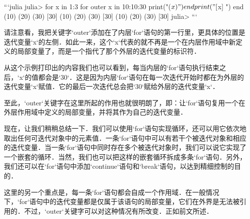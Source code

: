 ```julia
julia> for x in 1:3
           for outer x in 10:10:30
               print("($x) ")
           end
           print("[$x] ")
       end
(10) (20) (30) [30] (10) (20) (30) [30] (10) (20) (30) [30] 
julia> 
```

请注意看，我把关键字`outer`添加在了内层`for`语句的第一行里，更具体的位置是迭代变量`x`的左侧．如此一来，这个`x`代表的就不再是一个在内层作用域中新定义的局部变量了，而是一个指代了那个外层的迭代变量的标识符．

从这个示例打印出的内容我们也可以看到，每当内层的`for`语句执行结束之后，`x`的值都会是`30`．这是因为内层`for`语句在每一次迭代开始时都在为外层的迭代变量`x`赋值．它的最后一次迭代总会把`30`赋给外层的迭代变量`x`．

至此，`outer`关键字在这里所起的作用也就很明朗了，即：让`for`语句复用一个在外层作用域中定义的局部变量，并将其作为自己的迭代变量．

现在，让我们稍稍总结一下．我们可以使用`for`语句实现循环，还可以用它依次地取出任何可迭代对象中的元素值．一条`for`语句中可以有若干个被迭代对象和相应的迭代变量．当一条`for`语句中同时存在多个被迭代对象时，我们可以说它实现了一个嵌套的循环．当然，我们也可以把这样的嵌套循环拆成多条`for`语句．另外，我们还可以在`for`语句中添加`continue`语句和`break`语句，以达到精细控制的目的．

这里的另一个重点是，每一条`for`语句都会自成一个作用域．在一般情况下，`for`语句中的迭代变量都是仅属于该语句的局部变量，它们在外界是无法被引用的．不过，`outer`关键字可以对这种情况有所改变．正如前文所述．


